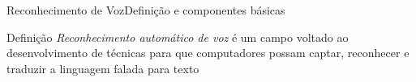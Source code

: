 \begin{frame}{Reconhecimento de Voz}{Definição e componentes básicas}

\begin{block}{Definição}
\emph{Reconhecimento automático de voz} é um campo voltado ao desenvolvimento de técnicas para que computadores possam captar, reconhecer e traduzir a linguagem falada para texto
\end{block}


\end{frame}
